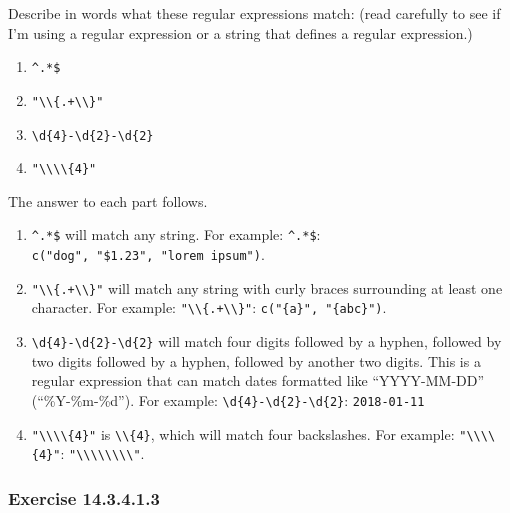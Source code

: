 \documentclass[]{book}
\providecommand{\tightlist}{%
  \setlength{\itemsep}{0pt}\setlength{\parskip}{0pt}}
\theoremstyle{plain}
\theoremstyle{remark}
\begin{document}
Describe in words what these regular expressions match: (read carefully to see if I'm using a regular expression or a string that defines a regular expression.)

\begin{enumerate}
\def\labelenumi{\arabic{enumi}.}
\tightlist
\item
  \texttt{\^{}.*\$}
\item
  \texttt{"\textbackslash{}\textbackslash{}\{.+\textbackslash{}\textbackslash{}\}"}
\item
  \texttt{\textbackslash{}d\{4\}-\textbackslash{}d\{2\}-\textbackslash{}d\{2\}}
\item
  \texttt{"\textbackslash{}\textbackslash{}\textbackslash{}\textbackslash{}\{4\}"}
\end{enumerate}

The answer to each part follows.

\begin{enumerate}
\def\labelenumi{\arabic{enumi}.}
\item
  \texttt{\^{}.*\$} will match any string. For example: \texttt{\^{}.*\$}: \texttt{c("dog",\ "\$1.23",\ "lorem\ ipsum")}.
\item
  \texttt{"\textbackslash{}\textbackslash{}\{.+\textbackslash{}\textbackslash{}\}"} will match any string with curly braces surrounding at least one character.
  For example: \texttt{"\textbackslash{}\textbackslash{}\{.+\textbackslash{}\textbackslash{}\}"}: \texttt{c("\{a\}",\ "\{abc\}")}.
\item
  \texttt{\textbackslash{}d\{4\}-\textbackslash{}d\{2\}-\textbackslash{}d\{2\}} will match four digits followed by a hyphen, followed by
  two digits followed by a hyphen, followed by another two digits.
  This is a regular expression that can match dates formatted like ``YYYY-MM-DD'' (``\%Y-\%m-\%d'').
  For example: \texttt{\textbackslash{}d\{4\}-\textbackslash{}d\{2\}-\textbackslash{}d\{2\}}: \texttt{2018-01-11}
\item
  \texttt{"\textbackslash{}\textbackslash{}\textbackslash{}\textbackslash{}\{4\}"} is \texttt{\textbackslash{}\textbackslash{}\{4\}}, which will match four backslashes.
  For example: \texttt{"\textbackslash{}\textbackslash{}\textbackslash{}\textbackslash{}\{4\}"}: \texttt{"\textbackslash{}\textbackslash{}\textbackslash{}\textbackslash{}\textbackslash{}\textbackslash{}\textbackslash{}\textbackslash{}"}.
\end{enumerate}

\hypertarget{exercise-14.3.4.1.3}{%
\subsubsection*{\texorpdfstring{Exercise {14.3.4.1.3}}{Exercise 14.3.4.1.3}}\label{exercise-14.3.4.1.3}}
\end{document}
